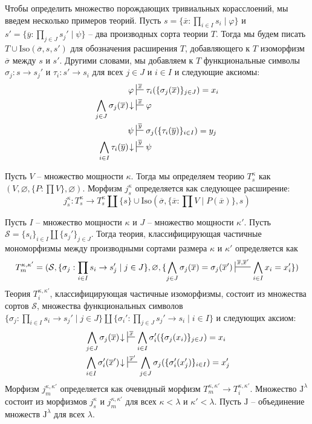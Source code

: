 \documentclass[reqno]{amsart}
\theoremstyle{definition}
\theoremstyle{remark}
\newcommand{\fs}[1]{\mathrm{#1}}
\newcommand{\J}{\mathrm{J}}
\begin{document}
Чтобы определить множество порождающих тривиальных корасслоений, мы введем несколько примеров теорий.
Пусть $s = \{ \overline{x} : \prod_{i \in I} s_i \mid \varphi \}$ и $s' = \{ \overline{y} : \prod_{j \in J} s_j' \mid \psi \}$ -- два производных сорта теории $T$.
Тогда мы будем писать $T \cup \fs{Iso}(\overline{\sigma},s,s')$ для обозначения расширения $T$, добавляющего к $T$ изоморфизм $\overline{\sigma}$ между $s$ и $s'$.
Другими словами, мы добавляем к $T$ функциональные символы $\sigma_j : s \to s_j'$ и $\tau_i : s' \to s_i$ для всех $j \in J$ и $i \in I$ и следующие аксиомы:
\begin{align*}
\varphi & \sststile{}{\overline{x}} \tau_i(\{ \sigma_j(\overline{x}) \}_{j \in J}) = x_i \\
\bigwedge_{j \in J} \sigma_j(\overline{x})\!\downarrow & \sststile{}{\overline{x}} \varphi \\
\psi & \sststile{}{\overline{y}} \sigma_j(\{ \tau_i(\overline{y}) \}_{i \in I}) = y_j \\
\bigwedge_{i \in I} \tau_i(\overline{y})\!\downarrow & \sststile{}{\overline{y}} \psi
\end{align*}

Пусть $V$ -- множество мощности $\kappa$.
Тогда мы определяем теорию $T^\kappa_s$ как $(V, \varnothing, \{ P : \prod V \}, \varnothing)$.
Морфизм $j^\kappa_s$ определяется как следующее расширение:
\[ j^\kappa_s : T^\kappa_s \to T^\kappa_s \amalg \{ s \} \cup \fs{Iso}(\overline{\sigma}, \{ \overline{x} : \prod V \mid P(\overline{x}) \}, s) \]

Пусть $I$ -- множество мощности $\kappa$ и $J$ -- множество мощности $\kappa'$.
Пусть $\mathcal{S} = \{ s_i \}_{i \in I} \amalg \{ s_j' \}_{j \in J}$.
Тогда теория, классифицирующая частичные мономорфизмы между производными сортами размера $\kappa$ и $\kappa'$ определяется как
\[ T_m^{\kappa,\kappa'} = (\mathcal{S}, \{ \sigma_j : \prod_{i \in I} s_i \to s_j' \mid j \in J \}, \varnothing, \{ \bigwedge_{j \in J} \sigma_j(\overline{x}) = \sigma_j(\overline{x}') \sststile{}{\overline{x},\overline{x}'} \bigwedge_{i \in I} x_i = x_i' \}) \]
Теория $T_i^{\kappa,\kappa'}$, классифицирующая частичные изоморфизмы, состоит из множества сортов $\mathcal{S}$, множества функциональных символов $\{ \sigma_j : \prod_{i \in I} s_i \to s_j' \mid j \in J \} \amalg \{ \sigma_i' : \prod_{j \in J} s_j' \to s_i \mid i \in I \}$ и следующих аксиом:
\begin{align*}
& \bigwedge_{j \in J} \sigma_j(\overline{x})\!\downarrow\ \sststile{}{\overline{x}} \bigwedge_{i \in I} \sigma_i'(\{ \sigma_j(x_i) \}_{j \in J}) = x_i \\
& \bigwedge_{i \in I} \sigma_i'(\overline{x}')\!\downarrow\ \sststile{}{\overline{x}'} \bigwedge_{j \in J} \sigma_j(\{ \sigma_i'(x_j') \}_{i \in I}) = x_j'
\end{align*}
Морфизм $j_m^{\kappa,\kappa'}$ определяется как очевидный морфизм $T_m^{\kappa,\kappa'} \to T_i^{\kappa,\kappa'}$.
Множество $\J^\lambda$ состоит из морфизмов $j^\kappa_s$ и $j_m^{\kappa,\kappa'}$ для всех $\kappa < \lambda$ и $\kappa' < \lambda$.
Пусть $\J$ -- объединение множеств $\J^\lambda$ для всех $\lambda$.
\end{document}
